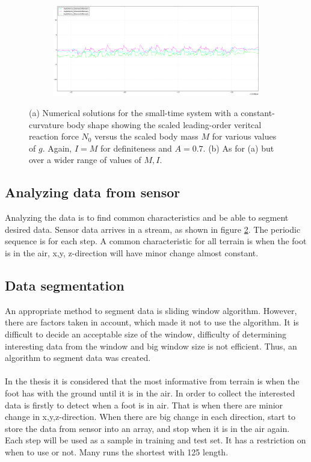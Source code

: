 \documentclass[USenglish]{ifimaster}  %
\begin{document}
\begin{figure}[h] \ContinuedFloat
	\begin{subfigure}[b]{\textwidth}
			\includegraphics[width=\textwidth,height=\textheight,keepaspectratio]{Figures/mykmattegraf}
		\caption{}
		\label{fig:mykmattegraf}
	\end{subfigure}
	\caption[Two numerical solutions]{(a) Numerical solutions for the small-time system 
		with a constant-curvature body shape showing the scaled leading-order veritcal 
		reaction force $N_0$ versus the scaled body mass $M$ for various values of $g$. 
		Again, $I=M$ for definiteness and $A=0.7$. (b) As for (a) but over a wider range of 
		values of $M,I$.}
	\label{fig:gtmgraf}
\end{figure}


\FloatBarrier


\subsection{Analyzing data from sensor}
Analyzing the data is to find common characteristics and be able to segment desired data. Sensor data arrives in a stream, as shown in figure \ref{fig:gtmgraf}. The periodic sequence is for each step. A common characteristic for all terrain is when the foot is in the air, x,y, z-direction will have minor change almost constant.

\subsection{Data segmentation} \label{subseq:segmentation}
An appropriate method to segment data is sliding window algorithm. However, there are factors taken in account, which made it not to use the algorithm. It is difficult to decide an acceptable size of the window, difficulty of determining interesting data from the window and big window size is not efficient. Thus, an algorithm to segment data was created. 
\\
\\
In the thesis it is considered that the most informative from terrain is when the foot has with the ground until it is in the air. In order to collect the interested data is firstly to detect when a foot is in air. That is when there are minior change in x,y,z-direction. When there are big change in each direction, start to store the data from sensor into an array, and stop when it is in the air again. Each step will be used as a sample in training and test set. It has a restriction on when to use or not. Many runs the shortest with 125 length.
\end{document}
